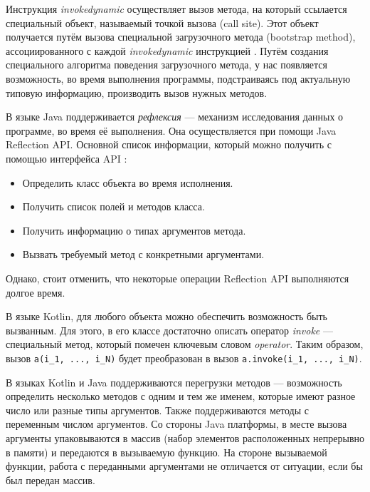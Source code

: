 Инструкция \textit{invokedynamic} осуществляет вызов метода, на который ссылается специальный объект, называемый точкой вызова (call site). Этот объект получается путём вызова специальной загрузочного метода (bootstrap method), ассоциированного с каждой \textit{invokedynamic} инструкцией \cite{book:yellin1996java}. Путём создания специального алгоритма поведения загрузочного метода, у нас появляется возможность, во время выполнения программы, подстраиваясь под актуальную типовую информацию, производить вызов нужных методов.


В языке Java поддерживается \textit{рефлексия} --- механизм исследования данных о программе, во время её выполнения. Она осуществляется при помощи Java Reflection API. Основной список информации, который можно получить с помощью интерфейса API \cite{java:forman2004javaReflectionsInAction}:

\begin{itemize}
    \item Определить класс объекта во время исполнения.
    \item Получить список полей и методов класса.
    \item Получить информацию о типах аргументов метода.
    \item Вызвать требуемый метод с конкретными аргументами.
\end{itemize}

Однако, стоит отменить, что некоторые операции Reflection API выполняются долгое время.


В языке Kotlin, для любого объекта можно обеспечить возможность быть вызванным. Для этого, в его классе достаточно описать оператор \textit{invoke} --- специальный метод, который помечен ключевым словом \textit{operator}. Таким образом, вызов \texttt{a(i_1, ..., i_N)} будет преобразован в вызов \texttt{a.invoke(i_1, ..., i_N)}.

В языках Kotlin и Java поддерживаются перегрузки методов --- возможность определить несколько методов с одним и тем же именем, которые имеют разное число или разные типы аргументов. Также поддерживаются методы с переменным числом аргументов. Со стороны Java платформы, в месте вызова аргументы упаковываются в массив (набор элементов расположенных непрерывно в памяти) и передаются в вызываемую функцию. На стороне вызываемой функции, работа с переданными аргументами не отличается от ситуации, если бы был передан массив.








